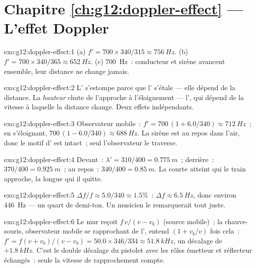 \section*{Chapitre \ref{ch:g12:doppler-effect} --- L'effet Doppler}

\begin{solution}{exo:g12:doppler-effect:1}
(a) $f' = 700 \times 340/315 \approx \qty{756}{Hz}$.
(b) $f' = 700 \times 340/365 \approx \qty{652}{Hz}$.
(c) \qty{700}{Hz}~: conducteur et sirène avancent ensemble, leur distance ne change jamais.
\end{solution}

\begin{solution}{exo:g12:doppler-effect:2}
L'\emph{} s'estompe parce que l' s'étale --- elle dépend de la distance.
La \emph{hauteur} chute de l'approche à l'éloignement --- l', qui dépend
de la vitesse à laquelle la distance change. Deux effets indépendants.
\end{solution}

\begin{solution}{exo:g12:doppler-effect:3}
Observateur mobile~: $f' = 700\,(1 + 6.0/340) \approx \qty{712}{Hz}$~; en s'éloignant,
$700\,(1 - 6.0/340) \approx \qty{688}{Hz}$. La sirène est au repos dans l'air, donc le motif
d' est intact~; seul l'observateur le traverse.
\end{solution}

\begin{solution}{exo:g12:doppler-effect:4}
Devant~: $\lambda' = 310/400 = \qty{0.775}{m}$~; derrière~: $370/400 = \qty{0.925}{m}$~; au
repos~: $340/400 = \qty{0.85}{m}$. La  courte atteint qui le train
approche, la longue qui il quitte.
\end{solution}

\begin{solution}{exo:g12:doppler-effect:5}
$\Delta f/f \approx 5.0/340 \approx 1.5\%$~: $\Delta f \approx \qty{6.5}{Hz}$, donc environ
\qty{446}{Hz} --- un quart de demi-ton. Un musicien le remarquerait tout juste.
\end{solution}

\begin{solution}{exo:g12:doppler-effect:6}
Le mur reçoit $f\,v/(v - v_b)$ (source mobile)~; la chauve-souris, observateur mobile se
rapprochant de l', entend $(1 + v_b/v)$ fois cela~: $f' = f(v + v_b)/(v - v_b) = 50.0 \times
346/334 \approx \qty{51.8}{kHz}$, un décalage de $+\qty{1.8}{kHz}$. C'est le double décalage
du pistolet  avec les rôles émetteur et réflecteur échangés~: seule la vitesse de
rapprochement compte.
\end{solution}

